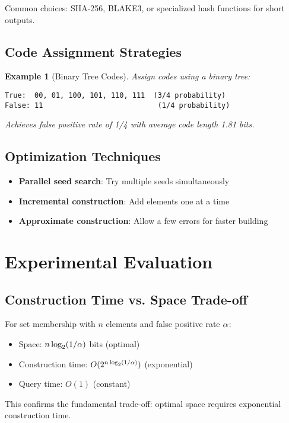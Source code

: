 \documentclass[11pt,final,hidelinks]{article}
\newtheorem{example}[theorem]{Example}
\begin{document}
Common choices: SHA-256, BLAKE3, or specialized hash functions for short outputs.

\subsection{Code Assignment Strategies}

\begin{example}[Binary Tree Codes]
Assign codes using a binary tree:
\begin{verbatim}
True:  00, 01, 100, 101, 110, 111  (3/4 probability)
False: 11                           (1/4 probability)
\end{verbatim}
Achieves false positive rate of 1/4 with average code length 1.81 bits.
\end{example}

\subsection{Optimization Techniques}

\begin{itemize}
    \item \textbf{Parallel seed search}: Try multiple seeds simultaneously
    \item \textbf{Incremental construction}: Add elements one at a time
    \item \textbf{Approximate construction}: Allow a few errors for faster building
\end{itemize}

\section{Experimental Evaluation}

\subsection{Construction Time vs. Space Trade-off}

For set membership with $n$ elements and false positive rate $\alpha$:
\begin{itemize}
    \item Space: $n \log_2(1/\alpha)$ bits (optimal)
    \item Construction time: $O(2^{n \log_2(1/\alpha)})$ (exponential)
    \item Query time: $O(1)$ (constant)
\end{itemize}

This confirms the fundamental trade-off: optimal space requires exponential construction time.
\end{document}
